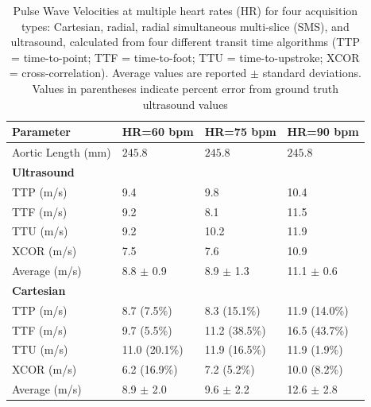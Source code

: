 \begin{table}[ht]
    \centering
    \caption[Phantom pulse wave velocities]{Pulse Wave Velocities at multiple heart rates (HR) for four acquisition types: Cartesian, radial, radial simultaneous multi-slice (SMS), and ultrasound, calculated from four different transit time algorithms (TTP = time-to-point; TTF = time-to-foot; TTU = time-to-upstroke; XCOR = cross-correlation). Average values are reported $\pm$ standard deviations. Values in parentheses indicate percent error from ground truth ultrasound values}\label{tab:phantom_PWVs}
    \small
    \ifFinal{}
    \fi
    \vspace{0.25cm}
    \begin{tabularx}{\textwidth}{lXXX}
    \toprule
    
    \textbf{Parameter} & \textbf{HR=60 bpm} & \textbf{HR=75 bpm} & \textbf{HR=90 bpm} \\
    
    \midrule
    Aortic Length (mm) & 
    \phantom{0000}$245.8$ & 
    \phantom{0000}$245.8$ & 
    \phantom{0000}$245.8$ \\

    \midrule
    \textbf{Ultrasound} & \phantom{0} & \phantom{0} & \phantom{0} \\

    TTP (m/s)  & \phantom{0}9.4 \phantom{(00.0\%)} & \phantom{0}9.8 \phantom{(00.0\%)} & 10.4 \phantom{(00.0\%)} \\
    TTF (m/s)  & \phantom{0}9.2 \phantom{(00.0\%)} & \phantom{0}8.1 \phantom{(00.0\%)} & 11.5 \phantom{(00.0\%)} \\
    TTU (m/s)  & \phantom{0}9.2 \phantom{(00.0\%)} & 10.2 \phantom{(00.0\%)} & 11.9 \phantom{(00.0\%)} \\
    XCOR (m/s) & \phantom{0}7.5 \phantom{(00.0\%)} & \phantom{0}7.6 \phantom{(00.0\%)} & 10.9 \phantom{(00.0\%)} \\
    Average (m/s) & \phantom{0}8.8\phantom{0} $\pm$ \phantom{0}0.9 & \phantom{0}8.9\phantom{0} $\pm$ \phantom{0}1.3 & 11.1\phantom{0} $\pm$ \phantom{0}0.6 \\

    \midrule
    \textbf{Cartesian} & \phantom{0} & \phantom{0} & \phantom{0} \\

    TTP (m/s)  & \phantom{0}8.7 (\phantom{0}7.5\%) & \phantom{0}8.3 (15.1\%) & 11.9 (14.0\%) \\
    TTF (m/s)  & \phantom{0}9.7 (\phantom{0}5.5\%) & 11.2 (38.5\%) & 16.5 (43.7\%) \\
    TTU (m/s)  & 11.0 (20.1\%) & 11.9 (16.5\%) & 11.9 (\phantom{0}1.9\%) \\
    XCOR (m/s) & \phantom{0}6.2 (16.9\%) & \phantom{0}7.2 (\phantom{0}5.2\%) & 10.0 (\phantom{0}8.2\%) \\
    Average (m/s) & \phantom{0}8.9\phantom{0} $\pm$ \phantom{0}2.0 & \phantom{0}9.6\phantom{0} $\pm$ \phantom{0}2.2 & 12.6\phantom{0} $\pm$ \phantom{0}2.8 \\


\end{tabularx}
\end{table}
